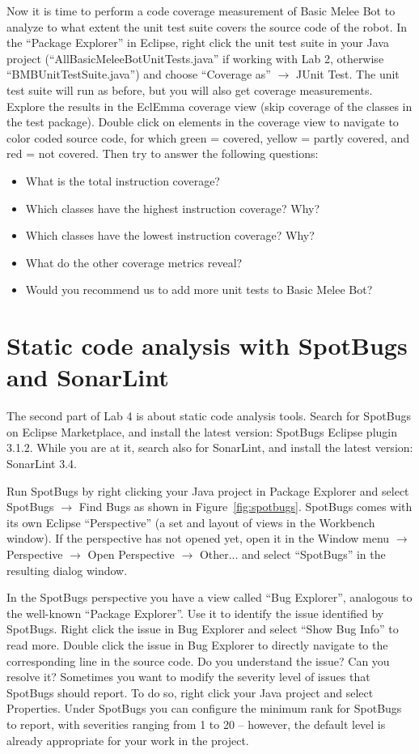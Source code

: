 \documentclass{scrreprt}
\begin{document}
Now it is time to perform a code coverage measurement of Basic Melee Bot to analyze to what extent the unit test suite covers the source code of the robot. In the ``Package Explorer'' in Eclipse, right click the unit test suite in your Java project (``AllBasicMeleeBotUnitTests.java'' if working with Lab 2, otherwise ``BMBUnitTestSuite.java'') and choose ``Coverage as'' $\rightarrow$ JUnit Test. The unit test suite will run as before, but you will also get coverage measurements. Explore the results in the EclEmma coverage view (skip coverage of the classes in the test package). Double click on elements in the coverage view to navigate to color coded source code, for which green = covered, yellow = partly covered, and red = not covered. Then try to answer the following questions:
\begin{itemize}
\item What is the total instruction coverage?
\item Which classes have the highest instruction coverage? Why?
\item Which classes have the lowest instruction coverage? Why?
\item What do the other coverage metrics reveal?   
\item Would you recommend us to add more unit tests to Basic Melee Bot?
\end{itemize}

\section{Static code analysis with SpotBugs and SonarLint}
The second part of Lab 4 is about static code analysis tools. Search for SpotBugs on Eclipse Marketplace, and install the latest version: SpotBugs Eclipse plugin 3.1.2. While you are at it, search also for SonarLint, and install the latest version: SonarLint 3.4.

Run SpotBugs by right clicking your Java project in Package Explorer and select SpotBugs $\rightarrow$ Find Bugs as shown in Figure~\ref{fig:spotbugs}. SpotBugs comes with its own Eclipse ``Perspective'' (a set and layout of views in the Workbench window). If the perspective has not opened yet, open it in the Window menu $\rightarrow$ Perspective $\rightarrow$ Open Perspective $\rightarrow$ Other... and select ``SpotBugs'' in the resulting dialog window.

In the SpotBugs perspective you have a view called ``Bug Explorer'', analogous to the well-known ``Package Explorer''. Use it to identify the issue identified by SpotBugs. Right click the issue in Bug Explorer and select ``Show Bug Info'' to read more. Double click the issue in Bug Explorer to directly navigate to the corresponding line in the source code. Do you understand the issue? Can you resolve it? Sometimes you want to modify the severity level of issues that SpotBugs should report. To do so, right click your Java project and select Properties. Under SpotBugs you can configure the minimum rank for SpotBugs to report, with severities ranging from 1 to 20 -- however, the default level is already appropriate for your work in the project.
\end{document}
